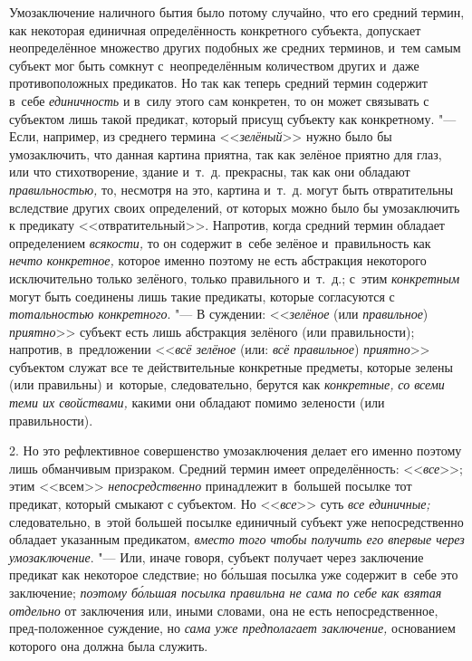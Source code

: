 Умозаключение наличного бытия было потому случайно, что его
средний термин, как некоторая единичная определённость конкретного
субъекта, допускает неопределённое множество других подобных же средних
терминов, и~тем самым субъект мог быть сомкнут с~неопределённым количеством
других и~даже противоположных предикатов. Но так как теперь средний термин
содержит в~себе {\em единичность}
и в~силу этого сам конкретен, то он может связывать с
субъектом лишь такой предикат, который присущ субъекту как конкретному. "---
Если, например, из среднего термина
<<{\em зелёный}>> нужно
было бы умозаключить, что данная картина приятна, так как зелёное приятно
для глаз, или что стихотворение, здание и~т.~д. прекрасны, так как они
обладают {\em правильностью,}
то, несмотря на это, картина и~т.~д. могут быть отвратительны
вследствие других своих определений, от которых можно было бы умозаключить
к предикату <<отвратительный>>. Напротив, когда средний термин обладает
определением {\em всякости,}
то он содержит в~себе зелёное и~правильность как
{\em нечто конкретное,}
которое именно поэтому не есть абстракция некоторого
исключительно только зелёного, только правильного и~т.~д.; с~этим
{\em конкретным} могут
быть соединены лишь такие предикаты, которые согласуются с
{\em тотальностью конкретного}. "---
В суждении:
<<{\em зелёное} (или
{\em правильное})
{\em приятно}>> субъект
есть лишь абстракция зелёного (или правильности); напротив, в~предложении
<<{\em всё зелёное} (или:
{\em всё правильное})
{\em приятно}>> субъектом
служат все те действительные конкретные предметы, которые зелены (или
правильны) и~которые, следовательно, берутся как
{\em конкретные,}
{\em со всеми теми их свойствами,}
какими они обладают помимо зелености (или правильности).

2. Но это рефлективное совершенство умозаключения делает его
именно поэтому лишь обманчивым призраком. Средний термин имеет
определённость: <<{\em все}>>; этим <<всем>> {\em непосредственно}
принадлежит в~большей посылке тот предикат, который смыкают с
субъектом. Но <<{\em все}>> суть {\em все единичные;}
следовательно, в~этой большей посылке единичный субъект уже
непосредственно обладает указанным предикатом,
{\em вместо того чтобы получить его
впервые через умозаключение}. "--- Или, иначе говоря, субъект
получает через заключение предикат как некоторое следствие; но б\'{о}льшая
посылка уже содержит в~себе это заключение;
{\em поэтому б\'{о}льшая посылка правильна не сама
по себе как взятая отдельно} от заключения или, иными
словами, она не есть непосредственное, пред-положенное суждение, но
{\em сама уже предполагает заключение,}
основанием которого она должна была служить.

